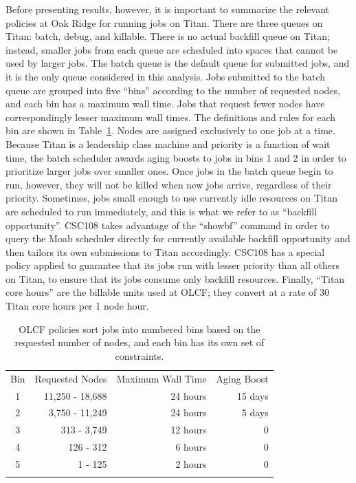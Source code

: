 Before presenting results, however, it is important to summarize the relevant
policies at Oak Ridge for running jobs on Titan. There are three queues on
Titan: batch, debug, and killable. There is no actual backfill queue on Titan;
instead, smaller jobs from each queue are scheduled into spaces that cannot be
used by larger jobs. The batch queue is the default queue for submitted jobs,
and it is the only queue considered in this analysis. Jobs submitted to the
batch queue are grouped into five ``bins'' according to the number of requested
nodes, and each bin has a maximum wall time. Jobs that request fewer nodes have
correspondingly lesser maximum wall times. The definitions and rules for each
bin are shown in Table~\ref{tab:olcfbins}. Nodes are assigned exclusively to
one job at a time. Because Titan is a leadership class machine and priority is
a function of wait time, the batch scheduler awards aging boosts to jobs in
bins 1 and 2 in order to prioritize larger jobs over smaller ones. Once jobs in
the batch queue begin to run, however, they will not be killed when new jobs
arrive, regardless of their priority. Sometimes, jobs small enough to use
currently idle resources on Titan are scheduled to run immediately, and this is
what we refer to as ``backfill opportunity''. CSC108 takes advantage of the
``showbf'' command in order to query the Moab scheduler directly for currently
available backfill opportunity and then tailors its own submissions to Titan
accordingly. CSC108 has a special policy applied to guarantee that its jobs run
with lesser priority than all others on Titan, to ensure that its jobs consume
only backfill resources. Finally, ``Titan core hours'' are the billable units
used at OLCF; they convert at a rate of 30 Titan core hours per 1 node hour.

\begin{table}
\caption{OLCF policies sort jobs into numbered bins based on the requested
number of nodes, and each bin has its own set of constraints.}
\label{tab:olcfbins}       %
\begin{tabular}{crrr}
\hline\noalign{\smallskip}
Bin & Requested Nodes   & Maximum Wall Time &   Aging Boost \\
\noalign{\smallskip}\hline\noalign{\smallskip}
1   &   11,250 - 18,688 &   24 hours        &   15 days     \\
2   &    3,750 - 11,249 &   24 hours        &    5 days     \\
3   &       313 - 3,749 &   12 hours        &         0     \\
4   &         126 - 312 &    6 hours        &         0     \\
5   &           1 - 125 &    2 hours        &         0     \\
\noalign{\smallskip}\hline
\end{tabular}
\end{table}


